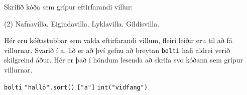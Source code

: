 \begin{exercise}\label{vil2}
Skrifið kóða sem grípur eftirfarandi villur:
	\begin{tasks}(2)
		\task\label{vil2-a} Nafnavilla.  
		\task\label{vil2-b} Eigindavilla.
		\task\label{vil2-c} Lyklavilla.
		\task\label{vil2-d} Gildisvilla.
	\end{tasks}
\end{exercise}
\begin{Answer}[ref={vil2}]
Hér eru kóðastubbar sem valda eftirfarandi villum, fleiri leiðir eru til að fá villurnar.
Svarið í a. lið er að því gefnu að breytan \texttt{bolti} hafi aldrei verið skilgreind áður.
Hér er það í höndum lesenda að skrifa svo kóðann sem grípur villurnar.
\begin{tasks}
	\task \texttt{bolti}
	\task \texttt{"halló".sort()}
	\task \texttt{{}["a"]} 
	\task \texttt{int("vidfang")}
\end{tasks}
\end{Answer}